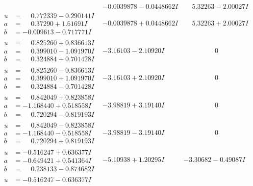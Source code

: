 \documentclass[1p]{elsarticle_modified}
\theoremstyle{definition}
\begin{document}
$$\begin{array}{c|c|c}
 & -0.0039878 - 0.0448662 I & \phantom{-}5.32263 - 2.00027 I \\ \hline\begin{aligned}
u &= \phantom{-}0.772339 - 0.290141 I \\
a &= \phantom{-}0.37290 + 1.61691 I \\
b &= -0.009613 - 0.717771 I\end{aligned}
 & -0.0039878 + 0.0448662 I & \phantom{-}5.32263 + 2.00027 I \\ \hline\begin{aligned}
u &= \phantom{-}0.825260 + 0.836613 I \\
a &= \phantom{-}0.399010 - 1.091970 I \\
b &= \phantom{-}0.324884 + 0.701428 I\end{aligned}
 & -3.16103 - 2.10920 I & \phantom{-0.000000 } 0 \\ \hline\begin{aligned}
u &= \phantom{-}0.825260 - 0.836613 I \\
a &= \phantom{-}0.399010 + 1.091970 I \\
b &= \phantom{-}0.324884 - 0.701428 I\end{aligned}
 & -3.16103 + 2.10920 I & \phantom{-0.000000 } 0 \\ \hline\begin{aligned}
u &= \phantom{-}0.842049 + 0.823858 I \\
a &= -1.168440 + 0.518558 I \\
b &= \phantom{-}0.720294 - 0.819193 I\end{aligned}
 & -3.98819 + 3.19140 I & \phantom{-0.000000 } 0 \\ \hline\begin{aligned}
u &= \phantom{-}0.842049 - 0.823858 I \\
a &= -1.168440 - 0.518558 I \\
b &= \phantom{-}0.720294 + 0.819193 I\end{aligned}
 & -3.98819 - 3.19140 I & \phantom{-0.000000 } 0 \\ \hline\begin{aligned}
u &= -0.516247 + 0.636377 I \\
a &= -0.649421 + 0.541364 I \\
b &= \phantom{-}0.238133 - 0.874682 I\end{aligned}
 & -5.10938 + 1.20295 I & -3.30682 - 0.49087 I \\ \hline\begin{aligned}
u &= -0.516247 - 0.636377 I \\

\end{aligned}
\end{array}$$
\end{document}
